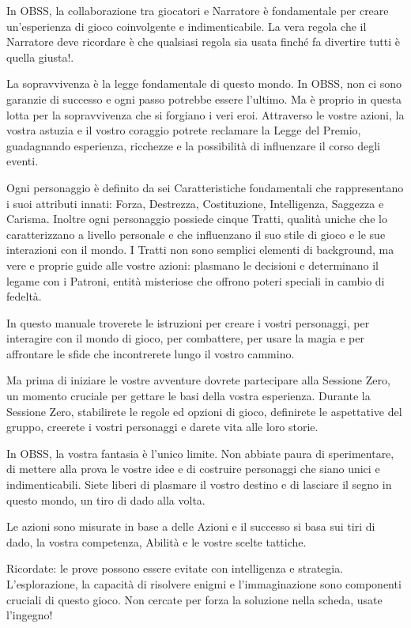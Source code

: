 \begin{multicols}{2}
In OBSS, la collaborazione tra giocatori e Narratore è fondamentale per creare un’esperienza di gioco coinvolgente e indimenticabile.
La vera regola che il Narratore deve ricordare è che qualsiasi regola sia usata finché fa divertire tutti è quella giusta!.

La sopravvivenza è la legge fondamentale di questo mondo. In OBSS, non ci sono garanzie di successo e ogni passo potrebbe essere l'ultimo. Ma è proprio in questa lotta per la sopravvivenza che si forgiano i veri eroi. Attraverso le vostre azioni, la vostra astuzia e il vostro coraggio potrete reclamare la Legge del Premio, guadagnando esperienza, ricchezze e la possibilità di influenzare il corso degli eventi.

Ogni personaggio è definito da sei Caratteristiche fondamentali che rappresentano i suoi attributi innati: Forza, Destrezza, Costituzione, Intelligenza, Saggezza e Carisma. Inoltre ogni personaggio possiede cinque Tratti, qualità uniche che lo caratterizzano a livello personale e che influenzano il suo stile di gioco e le sue interazioni con il mondo. I Tratti non sono semplici elementi di background, ma vere e proprie guide alle vostre azioni: plasmano le decisioni e determinano il legame con i Patroni, entità misteriose che offrono poteri speciali in cambio di fedeltà.

In questo manuale troverete le istruzioni per creare i vostri personaggi, per interagire con il mondo di gioco, per combattere, per usare la magia e per affrontare le sfide che incontrerete lungo il vostro cammino.

Ma prima di iniziare le vostre avventure dovrete partecipare alla Sessione Zero, un momento cruciale per gettare le basi della vostra esperienza. Durante la Sessione Zero, stabilirete le regole ed opzioni di gioco, definirete le aspettative del gruppo, creerete i vostri personaggi e darete vita alle loro storie.

In OBSS, la vostra fantasia è l'unico limite. Non abbiate paura di sperimentare, di mettere alla prova le vostre idee e di costruire personaggi che siano unici e indimenticabili. Siete liberi di plasmare il vostro destino e di lasciare il segno in questo mondo, un tiro di dado alla volta.

Le azioni sono misurate in base a delle Azioni e il successo si basa sui tiri di dado, la vostra competenza, Abilità e le vostre scelte tattiche.

Ricordate: le prove possono essere evitate con intelligenza e strategia. L'esplorazione, la capacità di risolvere enigmi e l'immaginazione sono componenti cruciali di questo gioco. Non cercate per forza la soluzione nella scheda, usate l'ingegno!


\end{multicols}
